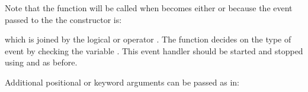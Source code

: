 \documentclass[letterpaper,10pt,english]{sphinxmanual}
\begin{document}
Note that the function  will be called when
 becomes either {\hyperref[\detokenize{index:rcpy.gpio.HIGH}]{}} or
{\hyperref[\detokenize{index:rcpy.gpio.LOW}]{}} because the event passed to the the
constructor {\hyperref[\detokenize{index:rcpy.gpio.InputEvent}]{}} is:

\begin{sphinxVerbatim}[commandchars=\\\{\}]
  
\end{sphinxVerbatim}

which is joined by the logical or operator \sphinxtitleref{\textbar{}}. The function
 decides on the type of event by checking the variable
. This event handler should be started and stopped using
{\hyperref[\detokenize{index:rcpy.gpio.InputEvent.start}]{}} and
{\hyperref[\detokenize{index:rcpy.gpio.InputEvent.stop}]{}} as before.

Additional positional or keyword arguments can be passed as in:

\begin{sphinxVerbatim}[commandchars=\\\{\}]
   

   
                                
                                
\end{sphinxVerbatim}
\end{document}
